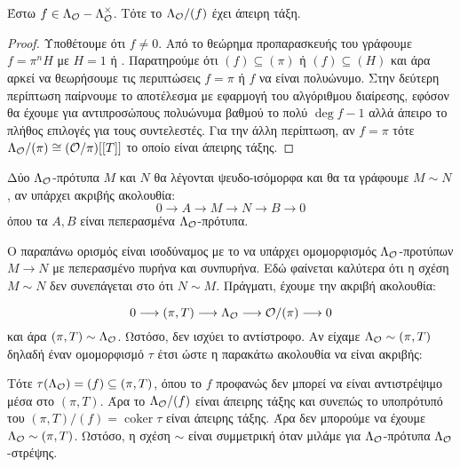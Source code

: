 \begin{lemma} \label{lemma4.10}
    Έστω $f \in \Lambda_\mathcal{O} - \Lambda_\mathcal{O}^\times$. Τότε το $\Lambda_\mathcal{O}/(f)$ έχει άπειρη τάξη.
\end{lemma}

\begin{proof}
    Υποθέτουμε ότι $f\neq 0$. Από το θεώρημα προπαρασκευής του  γράφουμε $f= \pi^n H$ με $H=1$ ή . Παρατηρούμε ότι $(f)\subseteq (\pi)$ ή $(f) \subseteq (H)$ και άρα αρκεί να θεωρήσουμε τις περιπτώσεις $f = \pi$ ή $f$ να είναι  πολυώνυμο. Στην δεύτερη περίπτωση παίρνουμε το αποτέλεσμα με εφαρμογή του αλγόριθμου διαίρεσης, εφόσον θα έχουμε για αντιπροσώπους πολυώνυμα βαθμού το πολύ $\deg f -1$ αλλά άπειρο το πλήθος επιλογές για τους συντελεστές. Για την άλλη περίπτωση, αν $f=\pi$ τότε $\Lambda_\mathcal{O}/(\pi) \cong (\mathcal{O}/\pi) [[T]]$ το οποίο είναι άπειρης τάξης.
\end{proof}

\begin{defn}
    Δύο $\Lambda_\mathcal{O}$-πρότυπα $M$ και $N$ θα λέγονται ψευδο-ισόμορφα και θα τα γράφουμε $M\sim N$, αν υπάρχει ακριβής ακολουθία:
    $$0 \longrightarrow A \longrightarrow M \longrightarrow N \longrightarrow B \longrightarrow 0$$ όπου τα $A,B$ είναι πεπερασμένα $\Lambda_\mathcal{O}$-πρότυπα.
\end{defn}

\noindent Ο παραπάνω ορισμός είναι ισοδύναμος με το να υπάρχει ομομορφισμός $\Lambda_\mathcal{O}$-προτύπων $M\longrightarrow N$ με πεπερασμένο πυρήνα 
και συνπυρήνα. Εδώ φαίνεται καλύτερα ότι η σχέση $M\sim N$ δεν συνεπάγεται στο ότι $N\sim M$. Πράγματι, έχουμε την ακριβή ακολουθία:

$$0 \longrightarrow (\pi,T) \longrightarrow \Lambda_\mathcal{O} \longrightarrow \mathcal{O}/(\pi)\longrightarrow 0$$ και άρα $(\pi,T) \sim \Lambda_\mathcal{O}$. Ωστόσο, δεν ισχύει το αντίστροφο. Αν είχαμε $\Lambda_\mathcal{O} \sim (\pi,T)$ δηλαδή έναν ομομορφισμό $\tau$ έτσι ώστε η παρακάτω ακολουθία να είναι ακριβής:

\begin{figure}[H]
    \centering
\end{figure}
\noindent Τότε $\tau(\Lambda_\mathcal{O}) = (f) \subseteq (\pi,T)$, όπου το $f$ προφανώς δεν μπορεί να είναι αντιστρέψιμο μέσα στο $(\pi,T)$. Άρα το $\Lambda_\mathcal{O}/(f)$ είναι άπειρης τάξης και συνεπώς το υποπρότυπό του $(\pi,T)/(f) = \operatorname{coker} \tau$ είναι άπειρης τάξης. Άρα δεν μπορούμε να έχουμε $\Lambda_\mathcal{O} \sim (\pi,T)$. Ωστόσο, η σχέση $\sim$ είναι συμμετρική όταν μιλάμε για $\Lambda_\mathcal{O}$-πρότυπα $\Lambda_\mathcal{O}$-στρέψης. 


